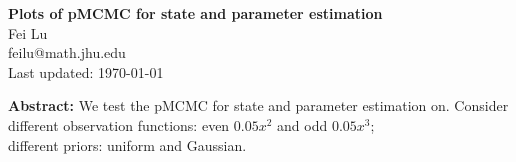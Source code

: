 \documentclass[12pt]{article}
\begin{document}
\begin{center}
\textbf{\Large Plots of pMCMC for state and parameter estimation} \\[0pt]
\vspace{4mm} Fei Lu\\
 feilu@math.jhu.edu \\
Last updated: \today  
\end{center}
 
\textbf{Abstract:} We test the pMCMC for state and parameter estimation on. Consider \\
 different observation functions: even $0.05x^2$ and odd $0.05x^3$;\\
 different priors: uniform and Gaussian. 

\end{document}
